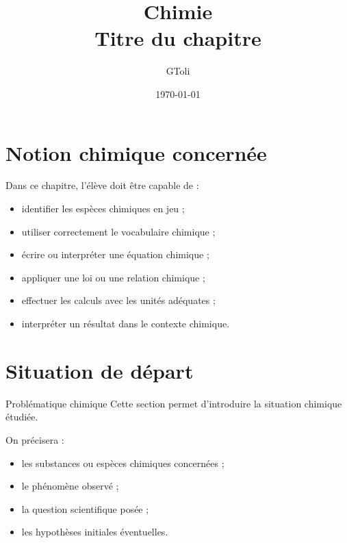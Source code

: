 \documentclass[11pt,a4paper]{article}
\title{\textbf{Chimie}\\[0.2cm]
\large Titre du chapitre}
\author{GToli}
\date{\today}
\begin{document}
\maketitle

\section{Notion chimique concernée}

\begin{cadreobjectif}
Dans ce chapitre, l’élève doit être capable de :
\begin{itemize}
    \item identifier les espèces chimiques en jeu ;
    \item utiliser correctement le vocabulaire chimique ;
    \item écrire ou interpréter une équation chimique ;
    \item appliquer une loi ou une relation chimique ;
    \item effectuer les calculs avec les unités adéquates ;
    \item interpréter un résultat dans le contexte chimique.
\end{itemize}
\end{cadreobjectif}

\section{Situation de départ}

\begin{cadrebleu}{Problématique chimique}
Cette section permet d’introduire la situation chimique étudiée.

\medskip

On précisera :
\begin{itemize}
    \item les substances ou espèces chimiques concernées ;
    \item le phénomène observé ;
    \item la question scientifique posée ;
    \item les hypothèses initiales éventuelles.
\end{itemize}
\end{cadrebleu}

\end{document}
